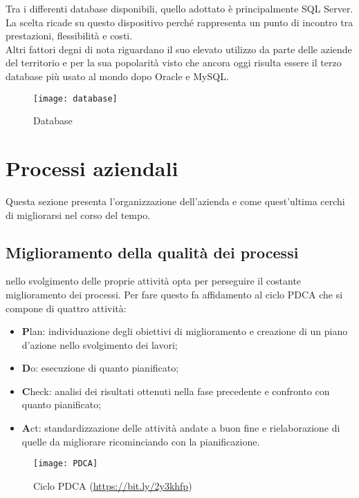Tra i differenti database disponibili, quello adottato \azienda è principalmente SQL Server. La scelta ricade su questo dispositivo perché rappresenta un punto di incontro tra prestazioni, flessibilità e costi.\\
Altri fattori degni di nota riguardano il suo elevato utilizzo da parte delle aziende del territorio e per la sua popolarità visto che ancora oggi risulta essere il terzo database più usato al mondo dopo Oracle e MySQL. 

\begin{figure}[!h] 
	\centering 
	\texttt{[image: database]} 
	\caption{Database}
\end{figure}


\section{Processi aziendali}
\label{cap1:Processi aziendali}

Questa sezione presenta l'organizzazione dell'azienda e come quest'ultima cerchi di migliorarsi nel corso del tempo. 

\subsection{Miglioramento della qualità dei processi}
\label{cap1:Miglioramento della qualità dei processi}

\azienda nello svolgimento delle proprie attività opta per perseguire il costante miglioramento dei processi. Per fare questo fa affidamento al ciclo PDCA che si compone di quattro attività:
\begin{itemize}
	\item \textbf{P}lan: individuazione degli obiettivi di miglioramento e creazione di un piano d'azione nello svolgimento dei lavori;
	\item \textbf{D}o: esecuzione di quanto pianificato;
	\item \textbf{C}heck: analisi dei risultati ottenuti nella fase precedente e confronto con quanto pianificato; 
	\item \textbf{A}ct: standardizzazione delle attività andate a buon fine e rielaborazione di quelle da migliorare ricominciando con la pianificazione.
\end{itemize}

\begin{figure}[!h] 
	\centering 
	\texttt{[image: PDCA]} 
	\caption{Ciclo PDCA (\url{https://bit.ly/2y3khfp})}
\end{figure}

